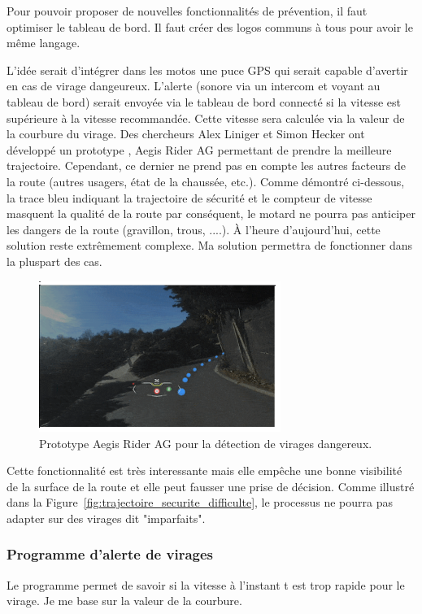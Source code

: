 Pour pouvoir proposer de nouvelles fonctionnalités de prévention, il faut optimiser le tableau de bord. Il faut créer des logos communs à tous pour avoir le même langage. 

L'idée serait d'intégrer dans les motos une puce GPS qui serait capable d'avertir en cas de virage dangeureux. L'alerte (sonore via un intercom et voyant au tableau de bord) serait envoyée via le tableau de bord connecté si la vitesse est supérieure à la vitesse recommandée. Cette vitesse sera calculée via la valeur de la courbure du virage. Des chercheurs Alex Liniger et Simon Hecker ont développé un prototype , Aegis Rider AG\cite{vitesse_virage_mcnews} permettant de prendre la meilleure trajectoire. Cependant, ce dernier ne prend pas en compte les autres facteurs de la route (autres usagers, état de la chaussée, etc.). Comme démontré ci-dessous, la trace bleu indiquant la trajectoire de sécurité et le compteur de vitesse masquent la qualité de la route par conséquent, le motard ne pourra pas anticiper les dangers de la route (gravillon, trous, ....). À l'heure d'aujourd'hui, cette solution reste extrêmement complexe. Ma solution permettra de fonctionner dans la pluspart des cas.

\begin{figure}[H]
    \centering
    \includegraphics[width=0.7\textwidth]{coeur_memoire/images/aegis.png} 
    \caption{Prototype Aegis Rider AG pour la détection de virages dangereux.}
\end{figure}
Cette fonctionnalité est très interessante mais elle empêche une bonne visibilité de la surface de la route et elle peut fausser une prise de décision.
Comme illustré dans la Figure~\ref{fig:trajectoire_securite_difficulte}, le processus ne pourra pas adapter sur des virages dit "imparfaits".

\subsubsection{Programme d'alerte de virages}
Le programme permet de savoir si la vitesse à l'instant t est trop rapide pour le virage. Je me base sur la valeur de la courbure.

